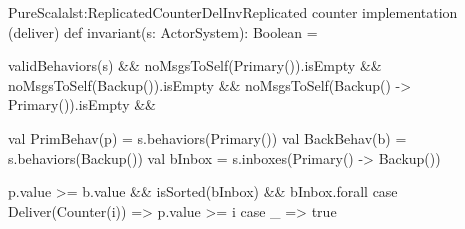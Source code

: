 \begin{Code}{PureScala}{lst:ReplicatedCounterDelInv}{Replicated counter implementation (deliver)}
def invariant(s: ActorSystem): Boolean = {
  validBehaviors(s)                           &&
  noMsgsToSelf(Primary()).isEmpty             &&
  noMsgsToSelf(Backup()).isEmpty              &&
  noMsgsToSelf(Backup() -> Primary()).isEmpty && {
    val PrimBehav(p) = s.behaviors(Primary())
    val BackBehav(b) = s.behaviors(Backup())
    val bInbox       = s.inboxes(Primary() -> Backup())

    p.value >= b.value && isSorted(bInbox) && bInbox.forall {
      case Deliver(Counter(i)) => p.value >= i
      case _                   => true
    }
  }
}
\end{Code}


%
%
%
%
%
%
%
%
%
%

